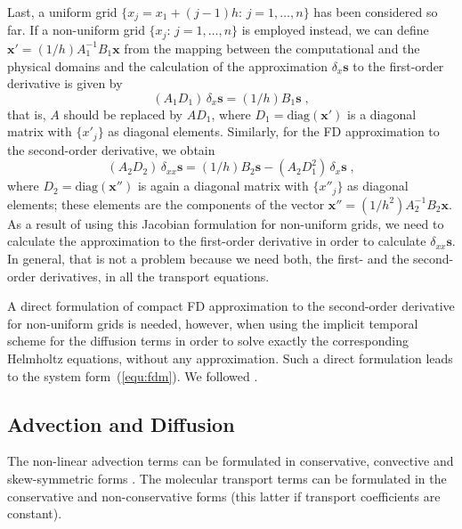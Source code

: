 Last, a uniform grid $\{x_j=x_1+(j-1)h:\, j = 1,\ldots,n\}$ has been considered
so far. If a non-uniform grid $\{x_j:\, j = 1,\ldots,n\}$ is employed instead,
we can define $\mathbf{x'} = (1/h)A_1^{-1}B_1\mathbf{x}$ from the mapping
between the computational and the physical domains and the calculation of the
approximation $\delta_{x} \mathbf{s}$ to the first-order derivative is given by
\begin{equation}
  (A_1D_1)\, \delta_x \mathbf{s}=(1/h)B_1 \mathbf{s} \;,
\end{equation}
that is, $A$ should be replaced by $AD_1$, where $D_1=\text{diag} (\mathbf{x'})$
is a diagonal matrix with $\{x'_j\}$ as diagonal elements. Similarly, for the FD
approximation to the second-order derivative, we obtain
\begin{equation}
  (A_2D_2)\, \delta_{xx} \mathbf{s}=(1/h)B_2 \mathbf{s} - (A_2D_1^2)\,\delta_x
  \mathbf{s} \;,
\end{equation}
where $D_2=\text{diag} (\mathbf{x''})$ is again a diagonal matrix with
$\{x''_j\}$ as diagonal elements; these elements are the components of the
vector $\mathbf{x''} = (1/h^2)A_2^{-1}B_2\mathbf{x}$. As a result of using this
Jacobian formulation for non-uniform grids, we need to calculate the
approximation to the first-order derivative in order to calculate $\delta_{xx}
\mathbf{s}$. In general, that is not a problem because we need both, the first-
and the second-order derivatives, in all the transport equations.

A direct formulation of compact FD approximation to the second-order derivative
for non-uniform grids is needed, however, when using the implicit temporal
scheme for the diffusion terms in order to solve exactly the corresponding
Helmholtz equations, without any approximation. Such a direct formulation leads
to the system form~(\ref{equ:fdm}). We followed \cite{Shukla:2005}.

\subsection{Advection and Diffusion}

The non-linear advection terms can be formulated in conservative, convective and
skew-symmetric forms \citep{Blaisdell:1996,Kravchenko:1997}. The molecular
transport terms can be formulated in the conservative and non-conservative forms
(this latter if transport coefficients are constant).

